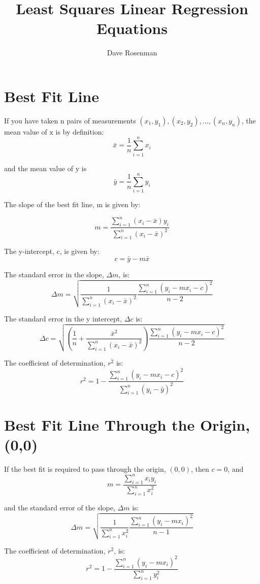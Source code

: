 \documentclass{article}
\title{Least Squares Linear Regression Equations}
\author{Dave Rosenman}
\begin{document}
	\maketitle
\section*{Best Fit Line}	
If you have taken $\mathrm{n}$ pairs of measurements $(x_1,y_1),(x_2,y_2),...,(x_n,y_n)$, the mean value of $\mathrm{x}$ is by definition:
$$\bar{x} = \frac{1}{n}\sum_{i=1}^n{x_i}$$

and the mean value of $\mathrm{y}$ is 
$$\bar{y} = \frac{1}{n}\sum_{i=1}^n{y_i}$$


The slope of the best fit line, $\mathrm{m}$ is given by:

$$m = \frac{\sum_{i=1}^n{(x_i - \bar{x})y_i}}{\sum_{i=1}^n{(x_i - \bar{x})^2}}
$$


The $\mathrm{y}$-intercept, $\mathrm{c}$, is given by:
$$c = \bar{y} - m\bar{x}$$


The standard error in the slope, $\Delta m$, is:
$$\Delta m = \sqrt{\frac{1}{\sum_{i=1}^n{(x_i - \bar{x})^2}}\frac{\sum_{i=1}^n{(y_i - mx_i - c )^2}}{n-2}}$$


The standard error in the y intercept, $\Delta c$ is:
$$\Delta c = \sqrt{\left(\frac{1}{n} + \frac{\bar{x}^2}{\sum_{i=1}^n{(x_i-\bar{x})^2}}\right)\frac{\sum_{i=1}^n{(y_i - mx_i - c )^2}}{n-2}}$$

The coefficient of determination, $r^2$ is:
$${r^2} = 1 - \frac{{\sum\limits_{i = 1}^n {{{\left( {{y_i} - m{x_i} - c} \right)}^2}} }}{{\sum\limits_{i = 1}^n {{{\left( {{y_i} - \bar y} \right)}^2}} }}$$

\section*{Best Fit Line Through the Origin, (0,0)}
If the best fit is required to pass through the origin, $(0,0)$, then $c = 0$, and 
$$m = \frac{\sum_{i=1}^n{x_iy_i}}{\sum_{i=1}^n{x_i^2}}$$


and the standard error of the slope, $\Delta m$ is:
$$\Delta m = \sqrt{\frac{1}{\sum_{i=1}^n{x_i^2}}\frac{\sum_{i=1}^n(y_i - mx_i)^2}{n-1}}$$

The coefficient of determination, $r^2$, is:
$${r^2} = 1 - \frac{{\sum\limits_{i = 1}^n {{{\left( {{y_i} - m{x_i}} \right)}^2}} }}{{\sum\limits_{i = 1}^n {{y_i^2}} }}$$
\end{document}
